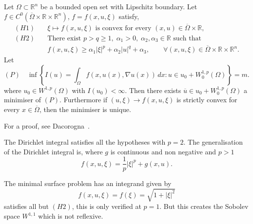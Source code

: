 \begin{theorem}
    \label{thm:General_existence_theorem}
    Let $\Omega \subset \mathbb{R}^n$ be a bounded open set with Lipschitz boundary. Let $f \in C^0(\overline{\Omega} \times \mathbb{R} \times \mathbb{R}^n)$, $f = f(x,u,\xi)$ satisfy,
    $$
    \begin{aligned}
    (H1)\quad &\xi \mapsto f(x,u,\xi)
    \text{ is convex for every }
    (x,u)\in\overline{\Omega}\times\mathbb{R},\\[0.5em]
    (H2)\quad &\text{There exist }
    p>q\ge1,\;
    \alpha_1>0,\;
    \alpha_2,\alpha_3\in\mathbb{R}
    \text{ such that}\\
    &f(x,u,\xi)
    \ge
    \alpha_1|\xi|^p
    +\alpha_2|u|^q
    +\alpha_3,
    \qquad
    \forall (x,u,\xi)\in
    \overline{\Omega}\times\mathbb{R}\times\mathbb{R}^n.
    \end{aligned}
    $$
    Let
    $$
    (P) \quad \inf \left\{ I(u) = \int_\Omega f(x,u(x), \nabla u(x)) \, dx : u \in u_0 + W_0^{1,p}(\Omega) \right\} = m.
    $$
    where $u_0\in W^{1,p}(\Omega)$ with $I(u_0) < \infty$. Then there exists $\overline{u} \in u_0 + W^{1,p}_0(\Omega)$ a minimiser of $(P)$.
    Furthermore if $(u,\xi) \rightarrow f(x,u,\xi)$ is strictly convex for every $x \in \overline{\Omega}$, then the minimiser is unique.
\end{theorem}

For a proof, see Dacorogna~\cite[p.~107]{dacorogna}.

\begin{example}
    The Dirichlet integral satisfies all the hypotheses with $p =2$. The generalisation of the Dirichlet integral is, where $g$ is continuous and non negative and $p>1$
$$
f(x,u,\xi) = \frac{1}{p}|\xi|^p +g(x,u).
$$
\end{example}

\begin{example}
    The minimal surface problem has an integrand given by
$$
f(x,u,\xi) = f(\xi) = \sqrt{1+|\xi|^2}
$$
satisfies all but $(H2)$, this is only verified at $p=1$. But this creates the Sobolev space $W^{1,1}$ which is not reflexive.
\end{example}

